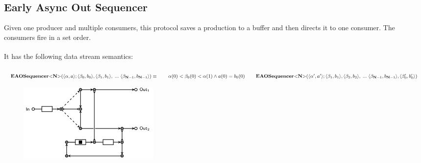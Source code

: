 \subsection{Early Async Out Sequencer}
  Given one producer and multiple consumers, this protocol saves a production to a buffer and then directs it to one consumer. The consumers fire in a set order.\\\\
  It has the following data stream semantics:\\\\
  $
  \vspace{0.2cm}\eaoseq (\langle \alpha, a \rangle;\langle \beta_0, b_0 \rangle, \langle \beta_1, b_1 \rangle,\;...\; \langle \beta_{\textbf{N}-1}, b_{\textbf{N}-1} \rangle) \equiv \\
  \vspace{0.2cm} \hphantom \qquad \alpha(0) < \beta_0(0) < \alpha(1) \land a(0) = b_0(0) \\
  \hphantom \qquad \eaoseq (\langle \alpha', a' \rangle; \langle \beta_1, b_1 \rangle,\langle \beta_2, b_2 \rangle,\;...\; \langle \beta_{\textbf{N}-1}, b_{\textbf{N}-1} \rangle, \langle \beta_0', b_0' \rangle)
  $
  \begin{figure}[H]
      \begin{center}
  \includegraphics[width=7cm]{img/eaoseq.png}
\end{center}
  \end{figure}
